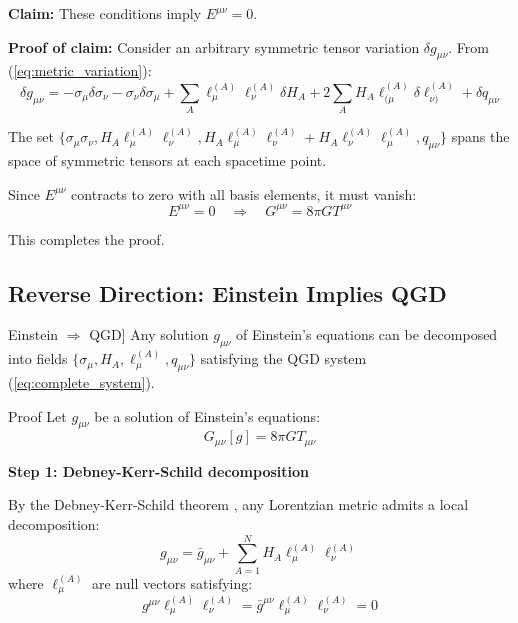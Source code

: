 \documentclass[11pt,a4paper]{article}
\theoremstyle{definition}
\theoremstyle{remark}
\begin{document}
		\textbf{Claim:} These conditions imply $E^{\mu\nu} = 0$.
		
		\textbf{Proof of claim:} Consider an arbitrary symmetric tensor variation $\delta g_{\mu\nu}$. From (\ref{eq:metric_variation}):
		\begin{equation}
			\delta g_{\mu\nu} = -\sigma_\mu\delta\sigma_\nu - \sigma_\nu\delta\sigma_\mu + \sum_A\ell_\mu^{(A)}\ell_\nu^{(A)}\delta H_A + 2\sum_A H_A\ell_{(\mu}^{(A)}\delta\ell_{\nu)}^{(A)} + \delta q_{\mu\nu}
		\end{equation}
		
		The set $\{\sigma_\mu\sigma_\nu, H_A\ell_\mu^{(A)}\ell_\nu^{(A)}, H_A\ell_\mu^{(A)}\ell_\nu^{(A)} + H_A\ell_\nu^{(A)}\ell_\mu^{(A)}, q_{\mu\nu}\}$ spans the space of symmetric tensors at each spacetime point.
		
		Since $E^{\mu\nu}$ contracts to zero with all basis elements, it must vanish:
		\begin{equation}
			E^{\mu\nu} = 0 \quad \Rightarrow \quad G^{\mu\nu} = 8\pi G T^{\mu\nu}
		\end{equation}
		
		This completes the proof.
	
	\subsection{Reverse Direction: Einstein Implies QGD}
	
	Einstein $\Rightarrow$ QGD]\label{thm:reverse}
		Any solution $g_{\mu\nu}$ of Einstein's equations can be decomposed into fields $\{\sigma_\mu, H_A, \ell_\mu^{(A)}, q_{\mu\nu}\}$ satisfying the QGD system (\ref{eq:complete_system}).
	
	Proof
		Let $g_{\mu\nu}$ be a solution of Einstein's equations:
		\begin{equation}
			G_{\mu\nu}[g] = 8\pi G T_{\mu\nu}
		\end{equation}
		
		\textbf{Step 1: Debney-Kerr-Schild decomposition}
		
		By the Debney-Kerr-Schild theorem \cite{Debney1969}, any Lorentzian metric admits a local decomposition:
		\begin{equation}
			g_{\mu\nu} = \bar{g}_{\mu\nu} + \sum_{A=1}^N H_A\ell_\mu^{(A)}\ell_\nu^{(A)}
		\end{equation}
		where $\ell_\mu^{(A)}$ are null vectors satisfying:
		\begin{equation}
			g^{\mu\nu}\ell_\mu^{(A)}\ell_\nu^{(A)} = \bar{g}^{\mu\nu}\ell_\mu^{(A)}\ell_\nu^{(A)} = 0
		\end{equation}
		
\end{document}

